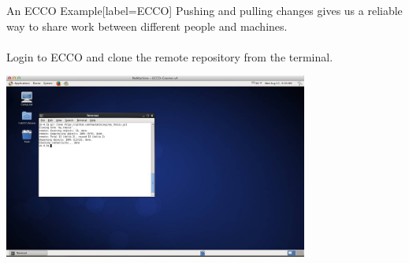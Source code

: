 \documentclass[10pt]{beamer}
\begin{document}
\begin{frame}[plain]{}



\end{frame}


\appendix

\begin{frame}[fragile]{An ECCO Example}[label=ECCO]
Pushing and pulling changes gives us a reliable way to share work between different people and machines.\\~\\

Login to ECCO and clone the remote repository from the terminal.

\begin{center}
\includegraphics[width=10cm]{./auxfiles/ECCO.jpg}
\end{center}



\end{frame}
\end{document}
